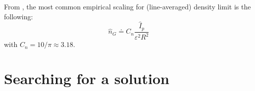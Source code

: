 From \cite[eq.(14.146)]{Freidberg2007}, the most common empirical scaling for (line-averaged) density limit is the following:
\begin{equation}
\boxed{\hat n_G \doteq C_n \frac{\hat I_p}{\varepsilon^2 R^2}  }
\label{eq:greenwald_density}
\end{equation}
with $C_n = 10/\pi \approx 3.18$.



\section{Searching for a solution}
